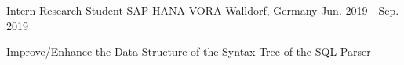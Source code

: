 
\begin{cventries}

  \cventry
    {Intern Research Student} %
    {SAP HANA VORA} %
    {Walldorf, Germany} %
    {Jun. 2019 - Sep. 2019} %
    {
      \begin{cvitems} %
        \item {Improve/Enhance the Data Structure of the Syntax Tree of
            the SQL Parser}
      \end{cvitems}
    }


\end{cventries}
